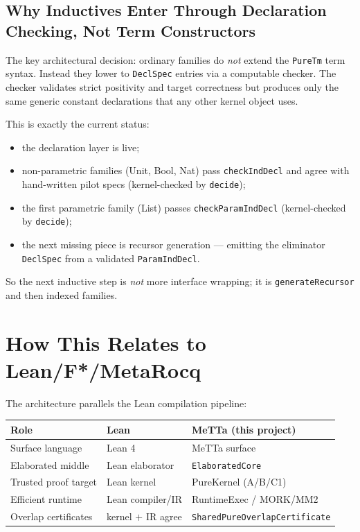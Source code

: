 \documentclass[11pt]{article}
\theoremstyle{remark}
\newcommand{\MeTTa}{\textup{MeTTa}}
\newcommand{\MORK}{\textup{MORK}}
\newcommand{\code}[1]{\texttt{#1}}
\newcommand{\leanref}[1]{\texttt{#1}}
\begin{document}
\subsection{Why Inductives Enter Through Declaration Checking, Not Term Constructors}

The key architectural decision: ordinary families do \emph{not} extend the
\leanref{PureTm} term syntax.
Instead they lower to \leanref{DeclSpec} entries via a computable checker.
The checker validates strict positivity and target correctness but produces
only the same generic constant declarations that any other kernel object uses.

\noindent
This is exactly the current status:
\begin{itemize}[nosep]
  \item the declaration layer is live;
  \item non-parametric families (Unit, Bool, Nat) pass \leanref{checkIndDecl}
  and agree with hand-written pilot specs (kernel-checked by \code{decide});
  \item the first parametric family (List) passes \leanref{checkParamIndDecl}
  (kernel-checked by \code{decide});
  \item the next missing piece is recursor generation --- emitting the
  eliminator \leanref{DeclSpec} from a validated \leanref{ParamIndDecl}.
\end{itemize}

\noindent
So the next inductive step is \emph{not} more interface wrapping; it is
\leanref{generateRecursor} and then indexed families.

\section{How This Relates to Lean/F*/MetaRocq}
\label{sec:lean-comparison}

The architecture parallels the Lean compilation pipeline:

\begin{center}
\small
\begin{tabular}{@{}lll@{}}
\toprule
Role & Lean & \MeTTa{} (this project) \\
\midrule
Surface language & Lean 4 & \MeTTa{} surface \\
Elaborated middle & Lean elaborator & \leanref{ElaboratedCore} \\
Trusted proof target & Lean kernel & PureKernel (A/B/C1) \\
Efficient runtime & Lean compiler/IR & RuntimeExec / \MORK{}/MM2 \\
Overlap certificates & kernel $+$ IR agree & \leanref{SharedPureOverlapCertificate} \\
\bottomrule
\end{tabular}
\end{center}
\end{document}
